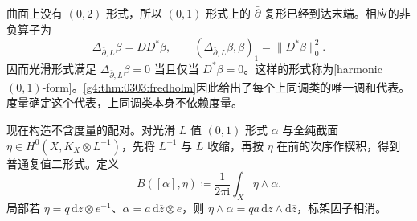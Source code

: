曲面上没有 \((0,2)\) 形式，所以 \((0,1)\) 形式上的 \(\bar\partial\) 复形已经到达末端。相应的非负算子为
\[
	\Delta_{\bar\partial,L}\beta=DD^*\beta,\qquad
	(\Delta_{\bar\partial,L}\beta,\beta)_1=\|D^*\beta\|_0^2.
\]
因而光滑形式满足 \(\Delta_{\bar\partial,L}\beta=0\) 当且仅当 \(D^*\beta=0\)。这样的形式称为[harmonic \((0,1)\)-form]。\cref{g4:thm:0303:fredholm}因此给出了每个上同调类的唯一调和代表。度量确定这个代表，上同调类本身不依赖度量。

\ProseParagraphBreak

现在构造不含度量的配对。对光滑 \(L\) 值 \((0,1)\) 形式 \(\alpha\) 与全纯截面 \(\eta\in H^0(X,K_X\otimes L^{-1})\)，先将 \(L^{-1}\) 与 \(L\) 收缩，再按 \(\eta\) 在前的次序作楔积，得到普通复值二形式。定义
\begin{equation}
	\label{g4:eq:0303:serre-pairing}
	B([\alpha],\eta)\coloneqq
	\frac1{2\pi\mathrm{i}}\int_X\eta\wedge\alpha.
\end{equation}
局部若 \(\eta=q\,\mathrm{d}z\otimes e^{-1}\)、\(\alpha=a\,\mathrm{d}\overline z\otimes e\)，则 \(\eta\wedge\alpha=qa\,\mathrm{d}z\wedge\mathrm{d}\overline z\)，标架因子相消。

